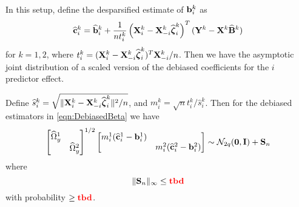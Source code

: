 \documentclass[12pt, letterpaper]{article}
\DeclareMathOperator*{\Th}{^{\text{th}}}
\numberwithin{equation}{section}
\begin{document}
In this setup, define the desparsified estimate of ${\bf{b}}_i^k$ as
%
\begin{align}\label{eqn:DebiasedBeta}
\widehat {{\bf{c}}}_i^k = \widehat {{\bf{b}}}_i^k + \frac{1}{n t_i^k} \left( {\mathbf{X}}_i^k - {\mathbf{X}}_{-i}^k \widehat {{\boldsymbol{\zeta}}}_i^k \right)^T
({\mathbf{Y}}^k - {\mathbf{X}}^k \widehat {{\mathbf{B}}}^k )
\end{align}
%
for $k = 1,2$, where $t_i^k = ( {\mathbf{X}}_i^k - {\mathbf{X}}_{-i}^k \widehat {{\boldsymbol{\zeta}}}_i^k )^T {\mathbf{X}}_{-i}^k/n$. Then we have the asymptotic joint distribution of a scaled version of the debiased coefficients for the $i\Th$ predictor effect.

\begin{Theorem}\label{Thm:ThmTesting}
Define $\widehat s_i^k = \sqrt{\| {\mathbf{X}}_i^k - {\mathbf{X}}_{-i}^k \widehat {{\boldsymbol{\zeta}}}_i^k \|^2/n}$, and $m_i^k = \sqrt n t_i^k / \widehat s_i^k$. Then for the debiased estimators in \eqref{eqn:DebiasedBeta} we have
%
\begin{align}\label{eqn:ThmTestingEqn}
\begin{bmatrix}
\widehat \Omega_y^1 &\\
& \widehat \Omega_y^2
\end{bmatrix}^{1/2}
%
\begin{bmatrix}
m_i^1 (\widehat \bfc_i^1 - \bfb_i^1) &\\
&  m_i^2 (\widehat \bfc_i^2 - \bfb_i^2)
\end{bmatrix}
\sim \cN_{2q} ({\bf 0}, \bfI) + \bfS_n
\end{align}
%
where
%
$$
\| {\mathbf{S}}_n \|_\infty \leq {\color{red} \bf tbd}
$$
%
with probability $\geq {\color{red} \bf tbd}$.
\end{Theorem}
%
\end{document}
